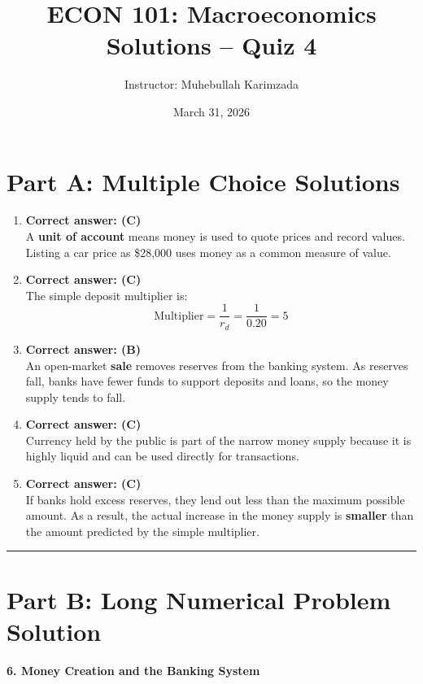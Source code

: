 \documentclass[12pt]{article}
\title{ECON 101: Macroeconomics \\ Solutions -- Quiz 4}
\author{Instructor: Muhebullah Karimzada}
\date{March 31,  2026}
\begin{document}
\maketitle


\section*{Part A: Multiple Choice Solutions}

\begin{enumerate}[label=\textbf{\arabic*.}]

\item \textbf{Correct answer: (C)}\\
A \textbf{unit of account} means money is used to quote prices and record values. Listing a car price as \$28{,}000 uses money as a common measure of value.

\item \textbf{Correct answer: (C)}\\
The simple deposit multiplier is:
\[
\text{Multiplier}=\frac{1}{r_d}=\frac{1}{0.20}=5
\]

\item \textbf{Correct answer: (B)}\\
An open-market \textbf{sale} removes reserves from the banking system. As reserves fall, banks have fewer funds to support deposits and loans, so the money supply tends to fall.

\item \textbf{Correct answer: (C)}\\
Currency held by the public is part of the narrow money supply because it is highly liquid and can be used directly for transactions.

\item \textbf{Correct answer: (C)}\\
If banks hold excess reserves, they lend out less than the maximum possible amount. As a result, the actual increase in the money supply is \textbf{smaller} than the amount predicted by the simple multiplier.

\end{enumerate}

\hrule
\vspace{1em}
\newpage
\section*{Part B: Long Numerical Problem Solution}

\textbf{6. Money Creation and the Banking System}
\end{document}
